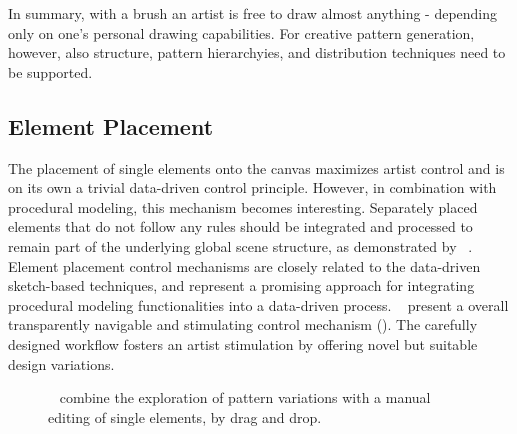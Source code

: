 

In summary, with a brush an artist is free to draw almost anything - depending only on one's personal drawing capabilities. For creative pattern generation, however, also structure, pattern hierarchyies, and distribution techniques need to be supported. 



\subsection{Element Placement}
\label{subsubsec:analysis_creative_means_elements}

The placement of single elements onto the canvas maximizes artist control and is on its own a trivial data-driven control principle. However, in combination with procedural modeling, this mechanism becomes interesting. Separately placed elements that do not follow any rules should be integrated and processed to remain part of the underlying global scene structure, as demonstrated by \citeauthor*{gieseke_2017_ooo}~\cite{gieseke_2017_ooo}.
Element placement control mechanisms are closely related to the data-driven sketch-based techniques, and represent a promising approach for integrating procedural modeling functionalities into a data-driven process. \citeauthor*{guerrero_2016_pep}~\cite{guerrero_2016_pep} present a overall transparently navigable and stimulating control mechanism (). The carefully designed workflow fosters an artist stimulation by offering novel but suitable design variations.

\begin{figure}[H]
    \centering
    \caption{\label{fig:guerrero_2016_pep}\citeauthor*{guerrero_2016_pep}~\cite{guerrero_2016_pep} combine the exploration of pattern variations with a manual editing of single elements, \eg by drag and drop.}
\end{figure}